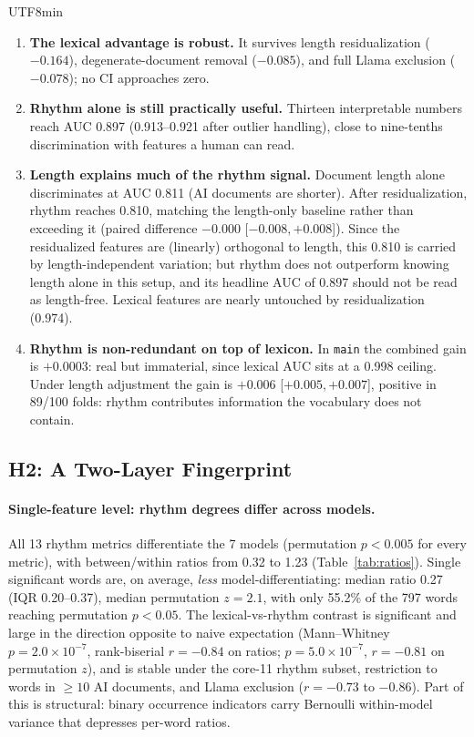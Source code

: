 \documentclass[11pt,a4paper]{article}
\begin{document}
\begin{CJK}{UTF8}{min}
\begin{enumerate}
    \item \textbf{The lexical advantage is robust.} It survives length residualization ($-0.164$), degenerate-document removal ($-0.085$), and full Llama exclusion ($-0.078$); no CI approaches zero.
    \item \textbf{Rhythm alone is still practically useful.} Thirteen interpretable numbers reach AUC 0.897 (0.913--0.921 after outlier handling), close to nine-tenths discrimination with features a human can read.
    \item \textbf{Length explains much of the rhythm signal.} Document length alone discriminates at AUC 0.811 (AI documents are shorter). After residualization, rhythm reaches 0.810, matching the length-only baseline rather than exceeding it (paired difference $-0.000$ [$-0.008, +0.008$]). Since the residualized features are (linearly) orthogonal to length, this 0.810 is carried by length-independent variation; but rhythm does not outperform knowing length alone in this setup, and its headline AUC of 0.897 should not be read as length-free. Lexical features are nearly untouched by residualization (0.974).
    \item \textbf{Rhythm is non-redundant on top of lexicon.} In \texttt{main} the combined gain is $+0.0003$: real but immaterial, since lexical AUC sits at a 0.998 ceiling. Under length adjustment the gain is $+0.006$ [$+0.005, +0.007$], positive in 89/100 folds: rhythm contributes information the vocabulary does not contain.
\end{enumerate}

\subsection{H2: A Two-Layer Fingerprint}
\label{sec:h2results}

\paragraph{Single-feature level: rhythm degrees differ across models.}
All 13 rhythm metrics differentiate the 7 models (permutation $p<0.005$ for every metric), with between/within ratios from 0.32 to 1.23 (Table~\ref{tab:ratios}). Single significant words are, on average, \emph{less} model-differentiating: median ratio 0.27 (IQR 0.20--0.37), median permutation $z=2.1$, with only 55.2\% of the 797 words reaching permutation $p<0.05$. The lexical-vs-rhythm contrast is significant and large in the direction opposite to naive expectation (Mann--Whitney $p=2.0\times10^{-7}$, rank-biserial $r=-0.84$ on ratios; $p=5.0\times10^{-7}$, $r=-0.81$ on permutation $z$), and is stable under the core-11 rhythm subset, restriction to words in $\geq 10$ AI documents, and Llama exclusion ($r=-0.73$ to $-0.86$). Part of this is structural: binary occurrence indicators carry Bernoulli within-model variance that depresses per-word ratios.


\end{CJK}
\end{document}
